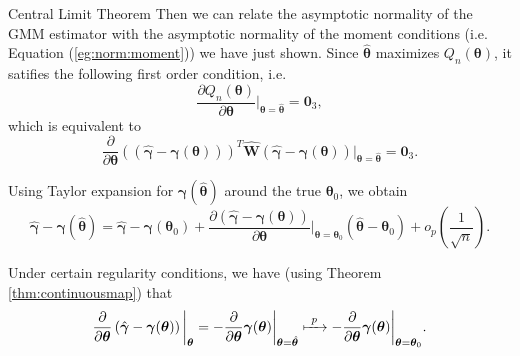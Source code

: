 \documentclass[envcountsect,usenames,dvipsnames]{beamer}
\def\btheta{\bm \theta}
\def\bgamma{\bm \gamma}
\def\W{\mathbf{W}}
\theoremstyle{mystyle}
\begin{document}
\begin{frame}{Central Limit Theorem}
\small
    Then we can relate the asymptotic normality of the GMM estimator with the asymptotic normality of the moment conditions (i.e. Equation (\ref{eg:norm:moment})) we have just shown. Since $\hat{\btheta}$ maximizes $Q_n(\bm{\theta})$, it satifies the following first order condition, i.e.
	 \begin{equation*}
        \frac{\partial Q_n(\bm{\theta})}{\partial \bm{\theta}} \bigg\rvert_{\bm{\theta} = \hat{\bm{\theta}}} = \bm{0}_{3},
	 \end{equation*}
	 which is equivalent to
	 \begin{equation}
        \label{eq:1order}
        \frac{\partial}{\partial \bm{\theta}} \left(\left( \hat{\bgamma} - \bgamma(\btheta) \right) \right)^T \widehat{\W} \left( \hat{\bgamma} - \bgamma(\btheta) \right) \bigg\rvert_{\bm{\theta} = \hat{\bm{\theta}}} = \bm{0}_{3}.
    \end{equation}
    
    
    Using Taylor expansion for $\bgamma(\hat{\btheta})$ around the true $\bm{\theta}_0$, we obtain
    \begin{equation}
        \label{eq:taylor}
        \hat{\bgamma} - \bgamma(\hat{\btheta})  = \hat{\bgamma} - \bgamma(\btheta_0) + \frac{\partial \left( \hat{\bgamma} - \bgamma(\btheta) \right)}{\partial \bm{\theta}}\bigg\rvert_{\bm{\theta} = \bm{\theta}_0} \left( \hat{\bm{\theta}} - \bm{\theta}_0 \right) + o_p\left(\frac{1}{\sqrt{n}}\right).
    \end{equation}
    
    Under certain regularity conditions, we have (using Theorem \ref{thm:continuousmap}) that
    \begin{equation*}
        \frac{\partial}{\partial \bm{\theta}} \left( \hat{\bgamma} - \bgamma(\btheta) \right)\bigg\rvert_{\bm{\theta}} = - \frac{\partial}{\partial \bm{\theta}}  \bgamma(\btheta) \bigg\rvert_{\bm{\theta} = \hat{\bm{\theta}}} \xmapsto[\;\;\;\;\; ]{p} - \frac{\partial}{\partial \bm{\theta}}  \bgamma(\btheta) \bigg\rvert_{\bm{\theta} = \bm{\theta}_0}.
    \end{equation*}
\end{frame}
\end{document}
